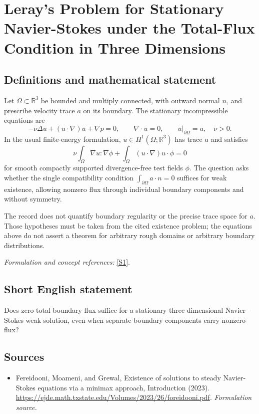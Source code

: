 \documentclass[11pt]{article}
\begin{document}
\section*{\texorpdfstring{Leray's Problem for Stationary Navier-Stokes under the Total-Flux Condition in Three Dimensions}{Leray's Problem for Stationary Navier-Stokes under the Total-Flux Condition in Three Dimensions}}\label{statement}
\subsection{Definitions and mathematical statement}
Let $\Omega\subset{\mathbb{R}}^3$ be bounded and multiply connected, with outward normal $n$, and prescribe velocity trace $a$ on its boundary. The stationary incompressible equations are
\[
 -\nu\Delta u+(u\cdot\nabla)u+\nabla p=0,
 \qquad\nabla\cdot u=0,\qquad u|_{\partial\Omega}=a,
 \quad\nu>0.
\]
In the usual finite-energy formulation, $u\in H^1(\Omega;{\mathbb{R}}^3)$ has trace $a$ and satisfies
\[
 \nu\int_\Omega\nabla u:\nabla\phi
 +\int_\Omega (u\cdot\nabla)u\cdot\phi=0
\]
for smooth compactly supported divergence-free test fields $\phi$. The question asks whether the single compatibility condition $\int_{\partial\Omega}a\cdot n=0$ suffices for weak existence, allowing nonzero flux through individual boundary components and without symmetry.

The record does not quantify boundary regularity or the precise trace space for $a$. Those hypotheses must be taken from the cited existence problem; the equations above do not assert a theorem for arbitrary rough domains or arbitrary boundary distributions.
\par\smallskip\textit{Formulation and concept references:} \href{https://ejde.math.txstate.edu/Volumes/2023/26/foreidooni.pdf}{[S1]}.

\subsection{Short English statement}
Does zero total boundary flux suffice for a stationary three-dimensional Navier--Stokes weak solution, even when separate boundary components carry nonzero flux?
\subsection{Sources}
\begin{itemize}
\item[S1]Fereidooni, Moameni, and Grewal, Existence of solutions to steady Navier-Stokes equations via a minimax approach, Introduction (2023).
\url{https://ejde.math.txstate.edu/Volumes/2023/26/foreidooni.pdf}.
\textit{Formulation source.}
\end{itemize}
\end{document}
